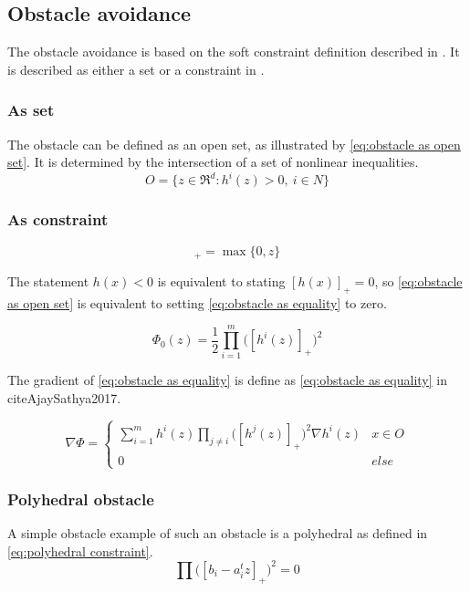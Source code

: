 		\subsection{Obstacle avoidance}
			The obstacle avoidance is based on the soft constraint definition described in \cite{AjaySathya2017}. It is described as either a set or a constraint in \cite{AjaySathya2017}.
			\subsubsection{As set}
				 The obstacle can be defined as an open set, as illustrated by \eqref{eq:obstacle as open set}. It is determined by the intersection of a set of nonlinear inequalities.
				\begin{equation}
					O = \{ z \in \Re^d : h^i(z)>0,\ i \in N \}
					\label{eq:obstacle as open set}
				\end{equation}
				
			\subsubsection{As constraint}
				\begin{equation}
					[z]_+ =  \max\{0,z\}
				\end{equation}
				
				The statement $h(x)<0$ is equivalent to stating $[h(x)]_+=0$, so \eqref{eq:obstacle as open set} is equivalent to setting \eqref{eq:obstacle as equality} to zero.
				
				\begin{equation}
					\Phi_0(z) =  \frac{1}{2} \prod_{i=1}^m \Big( [h^i(z)]_+ \Big)^2
					\label{eq:obstacle as equality}
				\end{equation}
				
				The gradient of \eqref{eq:obstacle as equality} is define as \eqref{eq:obstacle as equality} in cite{AjaySathya2017}.
				
				\begin{equation}
					\nabla \Phi =
					\begin{cases}
						\sum_{i=1}^{m} h^i(z)\prod_{j \ne i} \Big( [h^j(z)]_+ \Big)^2 \nabla h^i(z)
						& x \in O \\
						0 & else
					\end{cases}
					\label{eq:derivative obstacle as equality}
				\end{equation}
			
			\subsubsection{Polyhedral obstacle}
				A simple obstacle example of such an obstacle is a polyhedral as defined in \eqref{eq:polyhedral constraint}.
				\begin{equation}
					\prod \Big([b_i - a_i^t z]_+ \Big)^2 = 0
					\label{eq:polyhedral constraint}
				\end{equation}
			
